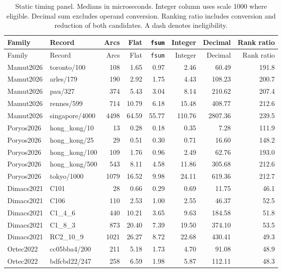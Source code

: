 \begingroup
\small
\setlength{\tabcolsep}{4pt}
\begin{longtable}{llrrrrrr}
\caption{Static timing panel. Medians in microseconds. Integer column uses scale 1000 where eligible. Decimal sum excludes operand conversion. Ranking ratio includes conversion and reduction of both candidates. A dash denotes ineligibility.}\\
\toprule
Family & Record & Arcs & Flat & \texttt{fsum} & Integer & Decimal & Rank ratio\\
\midrule
\endfirsthead
\toprule
Family & Record & Arcs & Flat & \texttt{fsum} & Integer & Decimal & Rank ratio\\
\midrule
\endhead
\bottomrule
\endfoot
Mamut2026 & toronto/100 & 108 & 1.65 & 0.97 & 2.46 & 60.49 & 191.8 \\
Mamut2026 & arles/179 & 190 & 2.92 & 1.75 & 4.43 & 108.23 & 200.7 \\
Mamut2026 & pau/327 & 374 & 5.43 & 3.04 & 8.14 & 210.62 & 207.4 \\
Mamut2026 & rennes/599 & 714 & 10.79 & 6.18 & 15.48 & 408.77 & 212.6 \\
Mamut2026 & singapore/4000 & 4498 & 64.59 & 55.77 & 110.76 & 2807.36 & 239.5 \\
Poryos2026 & hong\_kong/10 & 13 & 0.28 & 0.18 & 0.35 & 7.28 & 111.9 \\
Poryos2026 & hong\_kong/25 & 29 & 0.51 & 0.30 & 0.71 & 16.60 & 148.2 \\
Poryos2026 & hong\_kong/100 & 109 & 1.76 & 0.96 & 2.49 & 62.76 & 193.0 \\
Poryos2026 & hong\_kong/500 & 543 & 8.11 & 4.58 & 11.86 & 305.68 & 212.6 \\
Poryos2026 & tokyo/1000 & 1079 & 16.52 & 9.98 & 24.11 & 619.36 & 212.7 \\
Dimacs2021 & C101 & 28 & 0.66 & 0.29 & 0.69 & 11.75 & 46.1 \\
Dimacs2021 & C106 & 110 & 2.53 & 1.00 & 2.55 & 46.37 & 52.5 \\
Dimacs2021 & C1\_4\_6 & 440 & 10.21 & 3.65 & 9.63 & 184.58 & 51.8 \\
Dimacs2021 & C1\_8\_3 & 873 & 20.40 & 7.39 & 19.50 & 374.10 & 53.5 \\
Dimacs2021 & RC2\_10\_9 & 1021 & 26.27 & 8.72 & 22.68 & 430.41 & 49.3 \\
Ortec2022 & cc05bba4/200 & 211 & 5.18 & 1.73 & 4.70 & 91.08 & 48.9 \\
Ortec2022 & bdfcbd22/247 & 258 & 6.59 & 1.98 & 5.87 & 112.11 & 48.3 \\

\end{longtable}
